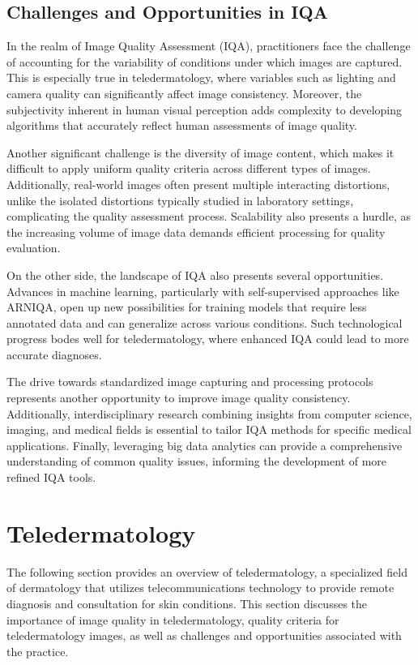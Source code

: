 \subsection{Challenges and Opportunities in IQA}
\label{sub:ChallengesOpportunitiesIQA}
In the realm of Image Quality Assessment (IQA), practitioners face the challenge of accounting for the variability of conditions under which images are captured. This is especially true in teledermatology, where variables such as lighting and camera quality can significantly affect image consistency. Moreover, the subjectivity inherent in human visual perception adds complexity to developing algorithms that accurately reflect human assessments of image quality.\par
\vspace{\baselineskip}
\noindent
Another significant challenge is the diversity of image content, which makes it difficult to apply uniform quality criteria across different types of images. Additionally, real-world images often present multiple interacting distortions, unlike the isolated distortions typically studied in laboratory settings, complicating the quality assessment process. Scalability also presents a hurdle, as the increasing volume of image data demands efficient processing for quality evaluation.\par
\vspace{\baselineskip}
\noindent
On the other side, the landscape of IQA also presents several opportunities. Advances in machine learning, particularly with self-supervised approaches like ARNIQA, open up new possibilities for training models that require less annotated data and can generalize across various conditions. Such technological progress bodes well for teledermatology, where enhanced IQA could lead to more accurate diagnoses.\par
\vspace{\baselineskip}
\noindent
The drive towards standardized image capturing and processing protocols represents another opportunity to improve image quality consistency. Additionally, interdisciplinary research combining insights from computer science, imaging, and medical fields is essential to tailor IQA methods for specific medical applications. Finally, leveraging big data analytics can provide a comprehensive understanding of common quality issues, informing the development of more refined IQA tools. \par


\section{Teledermatology}
\label{sec:Teledermatology}
The following section provides an overview of teledermatology, a specialized field of dermatology that utilizes telecommunications technology to provide remote diagnosis and consultation for skin conditions. This section discusses the importance of image quality in teledermatology, quality criteria for teledermatology images, as well as challenges and opportunities associated with the practice. \par
\vspace{\baselineskip}
\noindent

